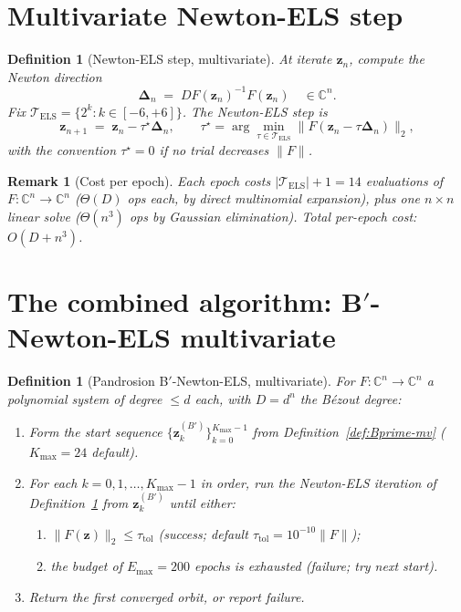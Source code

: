 \documentclass[11pt,a4paper]{article}
\newtheorem{definition}[theorem]{Definition}
\newtheorem{remark}[theorem]{Remark}
\begin{document}
\section{Multivariate Newton-ELS step}\label{sec:newton-ELS-mv}

\begin{definition}[Newton-ELS step, multivariate]\label{def:Newton-ELS-mv}
At iterate $\mathbf{z}_n$, compute the Newton direction
\begin{equation}\label{eq:Delta-mv}
\boldsymbol{\Delta}_n \;=\; DF(\mathbf{z}_n)^{-1} F(\mathbf{z}_n) \quad \in \mathbb{C}^{n}.
\end{equation}
Fix $\mathcal{T}_{\text{ELS}} = \{2^{k} : k \in [-6, +6]\}$. The Newton-ELS step is
\begin{equation}\label{eq:NELS-step}
\mathbf{z}_{n+1} \;=\; \mathbf{z}_n - \tau^{\star} \boldsymbol{\Delta}_n, \qquad \tau^{\star} = \arg\min_{\tau \in \mathcal{T}_{\text{ELS}}} \|F(\mathbf{z}_n - \tau \boldsymbol{\Delta}_n)\|_{2},
\end{equation}
with the convention $\tau^\star = 0$ if no trial decreases $\|F\|$.
\end{definition}

\begin{remark}[Cost per epoch]
Each epoch costs $|\mathcal{T}_{\text{ELS}}| + 1 = 14$ evaluations of $F: \mathbb{C}^n \to \mathbb{C}^n$ ($\Theta(D)$ ops each, by direct multinomial expansion), plus one $n \times n$ linear solve ($\Theta(n^3)$ ops by Gaussian elimination). Total per-epoch cost: $O(D + n^3)$.
\end{remark}

\section{The combined algorithm: B$'$-Newton-ELS multivariate}\label{sec:algorithm-mv}

\begin{definition}[Pandrosion B$'$-Newton-ELS, multivariate]\label{def:BNELS-mv}
For $F: \mathbb{C}^n \to \mathbb{C}^n$ a polynomial system of degree $\le d$ each, with $D = d^n$ the B\'ezout degree:
\begin{enumerate}
\item Form the start sequence $\{\mathbf{z}_k^{(B')}\}_{k=0}^{K_{\max}-1}$ from Definition~\ref{def:Bprime-mv} ($K_{\max} = 24$ default).
\item For each $k = 0, 1, \dots, K_{\max}-1$ in order, run the Newton-ELS iteration of Definition~\ref{def:Newton-ELS-mv} from $\mathbf{z}_k^{(B')}$ until either:
\begin{enumerate}
\item $\|F(\mathbf{z})\|_2 \le \tau_{\text{tol}}$ (success; default $\tau_{\text{tol}} = 10^{-10} \|F\|$);
\item the budget of $E_{\max} = 200$ epochs is exhausted (failure; try next start).
\end{enumerate}
\item Return the first converged orbit, or report failure.
\end{enumerate}
\end{definition}
\end{document}
